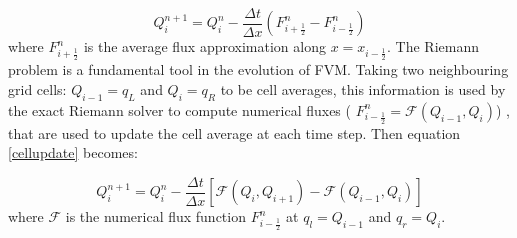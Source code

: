 \documentclass[11pt,a4paper]{article}
\newcommand{\donna}[1]{{\color{red}{#1}}}
\begin{document}
	\begin{equation}
		Q_{i}^{n+1} = Q_{i}^{n} - \frac{\Delta t}{\Delta x} (F_{i+\frac{1}{2}}^{n} - F_{i-\frac{1}{2}}^{n})
		\label{cellupdate}
	\end{equation}	
	where $F_{i+\frac{1}{2}}^{n} $ is the average flux approximation along $x=x_{i-\frac{1}{2}}$.
	The Riemann problem is a fundamental tool in the evolution of FVM. Taking two neighbouring grid cells: $Q_{i-1} = q_{L}$ and $Q_{i} = q_{R}$ to be cell averages, this information is used by the exact Riemann solver to compute numerical fluxes ( $F_{i-\frac{1}{2}}^{n} = \mathcal{F}(Q_{i-1} , Q_{i} )$) \donna{this returns the middle state.  The flux $f(q)$ is then evaluated at this middle state}, that are used to update the cell average at each time step. Then equation \eqref{cellupdate} becomes:
	
	\begin{equation}
		Q_{i}^{n+1} = Q_{i}^{n} - \frac{\Delta t}{\Delta x} \left[ \mathcal{F}(Q_{i} , Q_{i+1} ) - \mathcal{F}(Q_{i-1} , Q_{i} ) \right]
		\label{cellupdat}
	\end{equation}
	where $\mathcal{F}$ is the  numerical flux function $F_{i-\frac{1}{2}}^{n}$ at $q_l = Q_{i-1}$  and $q_r = Q_{i}$.
	
\end{document}
